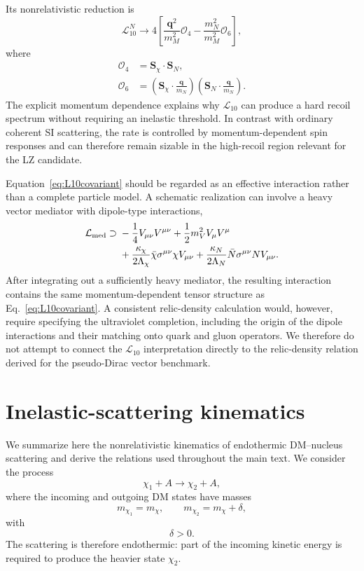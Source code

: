 \documentclass[aps,prd,reprint,superscriptaddress,nofootinbib,longbibliography,floatfix]{revtex4-2}
\begin{document}
Its nonrelativistic reduction is
\begin{equation}
\mathcal{L}_{10}^{N}
\longrightarrow
4
\left[
\frac{\bm q^{2}}{m_M^{2}}\mathcal{O}_{4}
-
\frac{m_N^{2}}{m_M^{2}}\mathcal{O}_{6}
\right],
\label{eq:L10NR}
\end{equation}
where
\begin{align}
\mathcal{O}_{4}
&=
\bm S_\chi\cdot\bm S_N,
\\
\mathcal{O}_{6}
&=
\left(
\bm S_\chi\cdot\frac{\bm q}{m_N}
\right)
\left(
\bm S_N\cdot\frac{\bm q}{m_N}
\right).
\end{align}
The explicit momentum dependence explains why $\mathcal{L}_{10}$ can produce a hard recoil spectrum without requiring an inelastic threshold. In contrast with ordinary coherent SI scattering, the rate is controlled by momentum-dependent spin responses and can therefore remain sizable in the high-recoil region relevant for the LZ candidate.

Equation~\eqref{eq:L10covariant} should be regarded as an effective interaction rather than a complete particle model. A schematic realization can involve a heavy vector mediator with dipole-type interactions,
\begin{align}
\mathcal{L}_{\rm med}
\supset{}&
-\frac{1}{4}V_{\mu\nu}V^{\mu\nu}
+
\frac{1}{2}m_V^2V_\mu V^\mu
\nonumber\\
&+
\frac{\kappa_\chi}{2\Lambda_\chi}
\bar\chi\sigma^{\mu\nu}\chi V_{\mu\nu}
+
\frac{\kappa_N}{2\Lambda_N}
\bar N\sigma^{\mu\nu}N V_{\mu\nu}.
\label{eq:L10mediator}
\end{align}
After integrating out a sufficiently heavy mediator, the resulting interaction contains the same momentum-dependent tensor structure as Eq.~\eqref{eq:L10covariant}. A consistent relic-density calculation would, however, require specifying the ultraviolet completion, including the origin of the dipole interactions and their matching onto quark and gluon operators. We therefore do not attempt to connect the $\mathcal{L}_{10}$ interpretation directly to the relic-density relation derived for the pseudo-Dirac vector benchmark.


\section{Inelastic-scattering kinematics}
\label{app:inelastic_kinematics}

We summarize here the nonrelativistic kinematics of endothermic DM--nucleus scattering and derive the relations used throughout the main text. We consider the process
\begin{equation}
\chi_1 + A \rightarrow \chi_2 + A,
\end{equation}
where the incoming and outgoing DM states have masses
\begin{equation}
m_{\chi_1}=m_\chi,
\qquad
m_{\chi_2}=m_\chi+\delta,
\end{equation}
with
\begin{equation}
\delta>0.
\end{equation}
The scattering is therefore endothermic: part of the incoming kinetic energy is required to produce the heavier state $\chi_2$.
\end{document}
